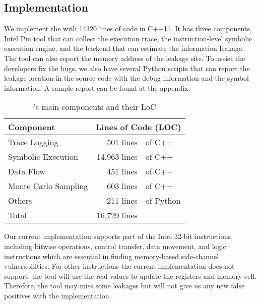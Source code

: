 \subsection{Implementation}
We implement the \tool{} with 14320 lines of code in C++11. 
It has three components, Intel
Pin tool that can collect the execution trace, 
the instruction-level symbolic execution
engine, and the backend that can estimate the information leakage. 
The tool can also report the memory address of the leakage site. 
To assist the developers fix the bugs,
we also have several Python scripts that can report the leakage 
location in the source code with the debug information and the symbol 
information. A sample report can be found at the appendix.

\begin{table}[h]
    \centering
    \begin{tabular}{lr@{~}@{}l}
    \hline
    Component                            & \multicolumn{2}{c}{Lines of Code (LOC)}    \\ \hline
    Trace Logging                        & 501 lines &of C++       \\ 
    Symbolic Execution                   & 14,963 lines &of C++    \\ 
    Data Flow                            & 451 lines &of C++       \\
    Monte Carlo Sampling                 & 603 lines &of C++       \\ 
    Others                               & 211 lines &of Python    \\ \hline
    Total    & 16,729 lines & \\\hline
    \end{tabular}
    \caption{\tool{}'s main components and their LoC}
\end{table}

Our current implementation supports part of the Intel 32-bit instructions, 
including bitwise operations, control transfer, data movement, and logic 
instructions which are essential in finding memory-based side-channel 
vulnerabilities. For other 
instructions the current implementation does not support, 
the tool will use the real values to update the registers and memory cell.
Therefore, the tool may miss some leakages but will not give us any new
false positives with the implementation.
